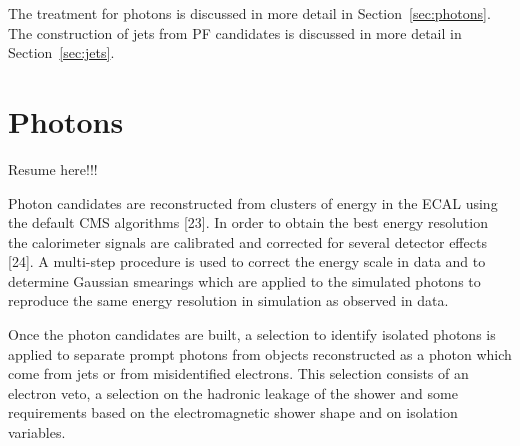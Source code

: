 The treatment for photons is discussed in more detail in Section~\ref{sec:photons}. The construction
of jets from PF candidates is discussed in more detail in Section~\ref{sec:jets}. 



\section{Photons\label{sec:photons}}

Resume here!!!

Photon candidates are reconstructed from clusters of energy in the ECAL using the default
CMS algorithms [23].  In order to obtain the best energy resolution the calorimeter signals are
calibrated and corrected for several detector effects [24].   A multi-step procedure is used to
correct the energy scale in data and to determine Gaussian smearings which are applied to
the simulated photons to reproduce the same energy resolution in simulation as observed in
data.

Once the photon candidates are built, a selection to identify isolated photons is applied to
separate prompt photons from objects reconstructed as a photon which come from jets or from
misidentified electrons.  This selection consists of an electron veto, a selection on the hadronic
leakage of the shower and some requirements based on the electromagnetic shower shape and
on isolation variables.

